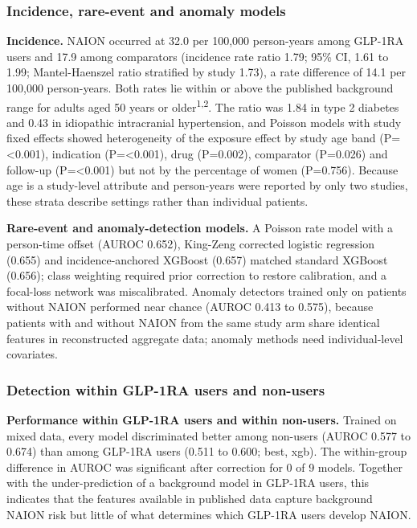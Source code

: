 \documentclass[
  11pt,
]{article}
\begin{document}
\subsubsection{Incidence, rare-event and anomaly
models}\label{incidence-rare-event-and-anomaly-models}

\textbf{Incidence.} NAION occurred at 32.0 per 100,000 person-years
among GLP-1RA users and 17.9 among comparators (incidence rate ratio
1.79; 95\% CI, 1.61 to 1.99; Mantel-Haenszel ratio stratified by study
1.73), a rate difference of 14.1 per 100,000 person-years. Both rates
lie within or above the published background range for adults aged 50
years or older\textsuperscript{1,2}. The ratio was 1.84 in type 2
diabetes and 0.43 in idiopathic intracranial hypertension, and Poisson
models with study fixed effects showed heterogeneity of the exposure
effect by study age band (P=\textless0.001), indication
(P=\textless0.001), drug (P=0.002), comparator (P=0.026) and follow-up
(P=\textless0.001) but not by the percentage of women (P=0.756). Because
age is a study-level attribute and person-years were reported by only
two studies, these strata describe settings rather than individual
patients.

\textbf{Rare-event and anomaly-detection models.} A Poisson rate model
with a person-time offset (AUROC 0.652), King-Zeng corrected logistic
regression (0.655) and incidence-anchored XGBoost (0.657) matched
standard XGBoost (0.656); class weighting required prior correction to
restore calibration, and a focal-loss network was miscalibrated. Anomaly
detectors trained only on patients without NAION performed near chance
(AUROC 0.413 to 0.575), because patients with and without NAION from the
same study arm share identical features in reconstructed aggregate data;
anomaly methods need individual-level covariates.

\subsubsection{Detection within GLP-1RA users and
non-users}\label{detection-within-glp-1ra-users-and-non-users}

\textbf{Performance within GLP-1RA users and within non-users.} Trained
on mixed data, every model discriminated better among non-users (AUROC
0.577 to 0.674) than among GLP-1RA users (0.511 to 0.600; best, xgb).
The within-group difference in AUROC was significant after correction
for 0 of 9 models. Together with the under-prediction of a background
model in GLP-1RA users, this indicates that the features available in
published data capture background NAION risk but little of what
determines which GLP-1RA users develop NAION.
\end{document}
